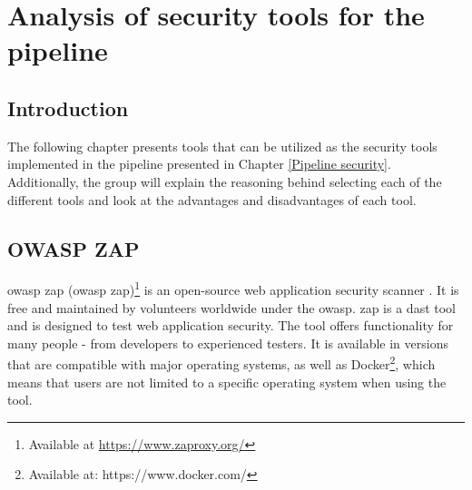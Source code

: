 \newpage
\thispagestyle{empty}
\mbox{}

\chapter{Analysis of security tools for the pipeline}
\label{chap:Tools}
\section{Introduction}
The following chapter presents tools that can be utilized as the security tools implemented in the \gls{pipeline} presented in Chapter \ref{Pipeline security}. Additionally, the group will explain the reasoning behind selecting each of the different tools and look at the advantages and disadvantages of each tool. 

\section{OWASP ZAP}
\acrshort{owasp} \acrlong{zap} (\acrshort{owasp} \acrshort{zap})\footnote{Available at \url{https://www.zaproxy.org/}} is an open-source web application security scanner \cite{owaspZAP}. It is free and maintained by volunteers worldwide under the \acrlong{owasp}. \acrshort{zap} is a \acrshort{dast} tool and is designed to test web application security. The tool offers functionality for many people - from developers to experienced testers. It is available in versions that are compatible with major operating systems, as well as Docker\footnote{Available at: https://www.docker.com/}, which means that users are not limited to a specific operating system when using the tool.

